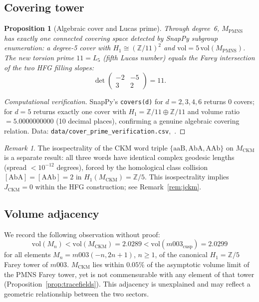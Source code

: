 \documentclass[11pt,a4paper]{article}
\newtheorem{proposition}[theorem]{Proposition}
\theoremstyle{definition}
\theoremstyle{remark}
\newtheorem{remark}[theorem]{Remark}
\newcommand{\ZZ}{\mathbb{Z}}
\newcommand{\MPMNS}{M_{\mathrm{PMNS}}}
\newcommand{\MCKM}{M_{\mathrm{CKM}}}
\begin{document}
\subsection{Covering tower}

\begin{proposition}[Algebraic cover and Lucas prime]
\label{prop:cover}
Through degree~6, $\MPMNS$ has exactly one connected
covering space detected by SnapPy subgroup enumeration:
a degree-5 cover with $H_1 \cong (\ZZ/11)^2$ and
$\mathrm{vol} = 5\,\mathrm{vol}(\MPMNS)$.
The new torsion prime $11 = L_5$ (fifth Lucas number) equals
the Farey intersection of the two HFG filling slopes:
\[
  \det\!\begin{pmatrix}-2&-5\\3&2\end{pmatrix} = 11.
\]
\end{proposition}

\begin{proof}[Computational verification]
SnapPy's \texttt{covers(d)} for $d=2,3,4,6$ returns 0 covers;
for $d=5$ returns exactly one cover with
$H_1 = \ZZ/11\oplus\ZZ/11$ and
volume ratio $= 5.0000000000$ (10 decimal places),
confirming a genuine algebraic covering relation.
Data: \texttt{data/cover\_prime\_verification.csv},~\cite{GitHub}.
\end{proof}

\begin{remark}
\label{rem:isospectral}
The isospectrality of the CKM word triple
$\{\mathrm{aaB},\mathrm{AbA},\mathrm{AAb}\}$ on $\MCKM$
is a separate result: all three words have identical complex
geodesic lengths (spread $< 10^{-12}$ degrees),
forced by the homological class collision
$[\mathrm{AbA}]=[\mathrm{AAb}]=2$ in $H_1(\MCKM)=\ZZ/5$.
This isospectrality implies $J_\mathrm{CKM}=0$ within the
HFG construction; see Remark~\ref{rem:jckm}.
\end{remark}

\subsection{Volume adjacency}

We record the following observation without proof:
\[
  \mathrm{vol}(M_n) < \mathrm{vol}(\MCKM) = 2.0289
  < \mathrm{vol}(m003_\mathrm{cusp}) = 2.0299
\]
for all elements $M_n = m003(-n,2n+1)$, $n\geq1$, of the
canonical $H_1=\ZZ/5$ Farey tower of $m003$.
$\MCKM$ lies within $0.05\%$ of the asymptotic volume limit
of the PMNS Farey tower, yet is not commensurable with any
element of that tower (Proposition~\ref{prop:tracefields}).
This adjacency is unexplained and may reflect a geometric
relationship between the two sectors.
\end{document}

